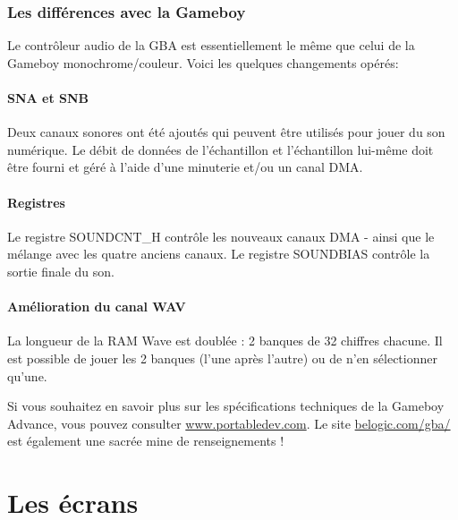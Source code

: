 \documentclass[12pt,a4paper]{article}
\begin{document}

    \subsubsection{Les différences avec la Gameboy}

    Le contrôleur audio de la GBA est essentiellement le même que celui de la Gameboy monochrome/couleur.
    Voici les quelques changements opérés:

    \paragraph{SNA et SNB} Deux canaux sonores ont été ajoutés qui peuvent être utilisés pour jouer du son numérique.
                            Le débit de données de l'échantillon et l'échantillon lui-même doit être fourni et géré à l'aide d'une minuterie et/ou un canal DMA.

    \paragraph{Registres} Le registre SOUNDCNT\_H contrôle les nouveaux canaux DMA - ainsi que le mélange avec les quatre anciens canaux.
                            Le registre SOUNDBIAS contrôle la sortie finale du son.

    \paragraph{Amélioration du canal WAV} La longueur de la RAM Wave est doublée : 2 banques de 32 chiffres chacune.
                            Il est possible de jouer les 2 banques (l'une après l'autre) ou de n'en sélectionner qu'une.

    \medskip
    Si vous souhaitez en savoir plus sur les spécifications techniques de la Gameboy Advance,
    vous pouvez consulter \href{http://www.portabledev.com/media/GBA/tutoriels/gbatek.htm}{www.portabledev.com}.
    Le site \href{http://belogic.com/gba/}{belogic.com/gba/} est également une sacrée mine de renseignements !

    \newpage
    \section{Les écrans}
  
\end{document}
